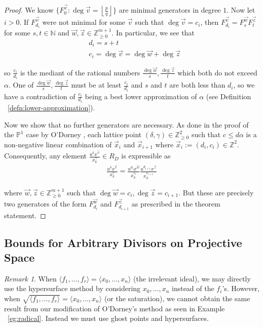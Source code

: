 \documentclass{amsart}
\theoremstyle{plain}
\theoremstyle{definition}
\theoremstyle{remark}
\newtheorem{rem}[thm]{Remark}
\numberwithin{equation}{section}
\newcommand\ssec{\subsection}
\newcommand\bn{{\mathbb N}}
\newcommand\bp{{\mathbb P}}
\newcommand\bz{{\mathbb Z}}
\begin{document}
\begin{proof}
We know $\{F_{0}^{\vec{v}} : \deg \vec{v} = \left\lfloor \frac{p}{q}
\right\rfloor \}$ are minimal generators in degree $1$. Now let $i >
0$. If $F_{d_i}^{\vec{v}}$ were not minimal for some $\vec{v}$ such
that $\deg \vec{v} = c_i$, then $F_{d_i}^{\vec{v}} = F_{s}^{\vec{w}}
F_{t}^{\vec{z}}$ for some $s, t \in \bn$ and $\vec{w}, \vec{z} \in
\bz_{\geq 0}^{m + 1}$. In particular, we see that 
\begin{align*}
	&d_i = s + t \\
	&c_i = \deg \vec{v} = \deg \vec{w} + \deg \vec{z}
\end{align*}

\noindent
so $\frac{c_i}{d_i}$ is the mediant of the rational numbers
$\frac{\deg \vec{w}}{s}, \frac{\deg \vec{z}}{t}$ which both
do not exceed $\alpha$. One of $\frac{\deg \vec{w}}{s},
\frac{\deg \vec{z}}{t}$ must be at least $\frac{c_i}{d_i}$
and $s$ and $t$ are both less than $d_i$, so we have a contradiction 
of $\frac{c_i}{d_i}$ being a best lower approximation of $\alpha$
(see Definition ~\ref{defn:lower-approximation}).

Now we show that no further generators are necessary. As done in
the proof of the $\bp^1$ case by O'Dorney \cite[Theorem 6]
{dorney:canonical}, each lattice point $(\delta, \gamma) \in \bz_{\geq 0}^2$
such that $c \leq d \alpha$ is a non-negative linear combination of
$\vec{x}_i$ and $\vec{x}_{i + 1}$ where $\vec{x}_i := (d_i, c_i) \in
\bz^2$. Consequently, any element $\frac{u^{\delta} x^{\vec{v}}}
{x_k^{\gamma}} \in R_D$ is expressible as
\begin{align*}
	\frac{u^{\delta} x^{\vec{v}}} {x_k^{\gamma}} = \frac{u^{d_i} x^{\vec{w}}}
	{x_k^{c_i}} \frac{u^{d_{i + 1}} x^{\vec{z}}} {x_k^{c_{i + 1}}}
\end{align*}

\noindent
where $\vec{w}, \vec{z} \in \bz_{\geq 0}^{m + 1}$ such that $\deg
\vec{w} = c_i, \deg \vec{z} = c_{i + 1}$. But these are precisely
two generators of the form $F_{d_i}^{\vec{w}}$ and $F_{d_{i + 1}}
^{\vec{z}}$ as prescribed in the theorem statement.

\end{proof}


\ssec{Bounds for Arbitrary Divisors on Projective Space}

\begin{rem}
When $\langle f_1, \ldots, f_r \rangle = \langle x_0, \ldots, x_n \rangle$ (the irrelevant ideal), we may directly use the hypersurface method by considering $x_0, \ldots, x_n$ instead of the $f_i$'s. However, when $\sqrt{\langle f_1, \ldots, f_r \rangle} = \langle x_0, \ldots, x_n \rangle$ (or the saturation), we cannot obtain the same result from our modification of O'Dorney's method as seen in Example ~\ref{eg:radical}. Instead we must use ghost points and hypersurfaces.
\end{rem}
\end{document}
